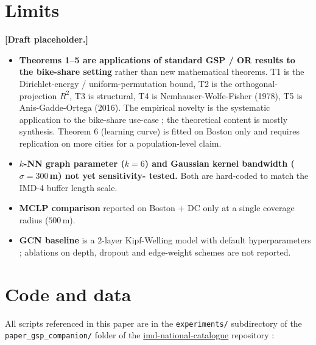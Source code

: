 \documentclass[11pt,a4paper]{article}
\begin{document}
\section{Limits}
\label{sec:limits}

\textbf{[Draft placeholder.]}

\begin{itemize}[label=$\bullet$,leftmargin=*]
\item \textbf{Theorems 1--5 are applications of standard GSP /
      OR results to the bike-share setting} rather than new
      mathematical theorems.  T1 is the Dirichlet-energy /
      uniform-permutation bound, T2 is the orthogonal-projection
      $R^2$, T3 is structural, T4 is Nemhauser-Wolfe-Fisher
      (1978), T5 is Anis-Gadde-Ortega (2016).  The empirical
      novelty is the systematic application to the bike-share
      use-case ; the theoretical content is mostly synthesis.
      Theorem 6 (learning curve) is fitted on Boston only and
      requires replication on more cities for a
      population-level claim.
\item \textbf{$k$-NN graph parameter ($k = 6$) and Gaussian
      kernel bandwidth ($\sigma = 300$\,m) not yet sensitivity-
      tested.}  Both are hard-coded to match the IMD-4 buffer
      length scale.
\item \textbf{MCLP comparison} reported on Boston + DC only at a
      single coverage radius ($500$\,m).
\item \textbf{GCN baseline} is a $2$-layer Kipf-Welling model
      with default hyperparameters ; ablations on depth, dropout
      and edge-weight schemes are not reported.
\end{itemize}

\section{Code and data}

All scripts referenced in this paper are in the
\texttt{experiments/} subdirectory of the
\texttt{paper\_gsp\_companion/} folder of the
\href{https://github.com/rohanfosse/imd-national-catalogue}{imd-national-catalogue}
repository :
\end{document}
